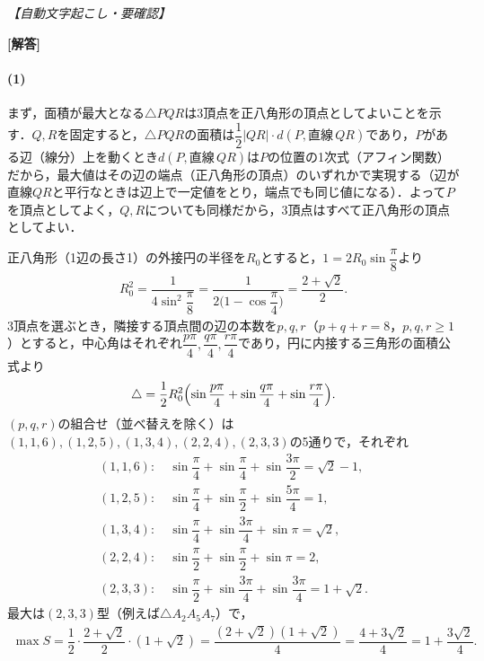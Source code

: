 \documentclass[../../main.tex]{subfiles}
\begin{document}
\begin{oframed}
  
\end{oframed}

\begin{flushright}
  \footnotesize\textit{【自動文字起こし・要確認】}
\end{flushright}

{\bf [解答]}
\paragraph{(1)}

まず，面積が最大となる$\triangle PQR$は3頂点を正八角形の頂点としてよいことを示す．$Q,R$を固定すると，$\triangle PQR$の面積は$\dfrac{1}{2}|QR|\cdot d(P,\text{直線}\,QR)$であり，$P$がある辺（線分）上を動くとき$d(P,\text{直線}\,QR)$は$P$の位置の1次式（アフィン関数）だから，最大値はその辺の端点（正八角形の頂点）のいずれかで実現する（辺が直線$QR$と平行なときは辺上で一定値をとり，端点でも同じ値になる）．よって$P$を頂点としてよく，$Q,R$についても同様だから，3頂点はすべて正八角形の頂点としてよい．

正八角形（1辺の長さ1）の外接円の半径を$R_0$とすると，$1=2R_0\sin\dfrac{\pi}{8}$より
\begin{align}
  R_0^2=\dfrac{1}{4\sin^2\dfrac{\pi}{8}}=\dfrac{1}{2\bigl(1-\cos\dfrac{\pi}{4}\bigr)}=\dfrac{2+\sqrt{2}}{2}.
\end{align}
3頂点を選ぶとき，隣接する頂点間の辺の本数を$p,q,r$（$p+q+r=8$，$p,q,r\ge1$）とすると，中心角はそれぞれ$\dfrac{p\pi}{4},\dfrac{q\pi}{4},\dfrac{r\pi}{4}$であり，円に内接する三角形の面積公式より
\begin{align}
  \triangle=\dfrac{1}{2}R_0^2\Bigl(\sin\dfrac{p\pi}{4}+\sin\dfrac{q\pi}{4}+\sin\dfrac{r\pi}{4}\Bigr).
\end{align}
$(p,q,r)$の組合せ（並べ替えを除く）は$(1,1,6),(1,2,5),(1,3,4),(2,2,4),(2,3,3)$の5通りで，それぞれ
\begin{align}
  (1,1,6):&\ \sin\dfrac{\pi}{4}+\sin\dfrac{\pi}{4}+\sin\dfrac{3\pi}{2}=\sqrt{2}-1,\\
  (1,2,5):&\ \sin\dfrac{\pi}{4}+\sin\dfrac{\pi}{2}+\sin\dfrac{5\pi}{4}=1,\\
  (1,3,4):&\ \sin\dfrac{\pi}{4}+\sin\dfrac{3\pi}{4}+\sin\pi=\sqrt{2},\\
  (2,2,4):&\ \sin\dfrac{\pi}{2}+\sin\dfrac{\pi}{2}+\sin\pi=2,\\
  (2,3,3):&\ \sin\dfrac{\pi}{2}+\sin\dfrac{3\pi}{4}+\sin\dfrac{3\pi}{4}=1+\sqrt{2}.
\end{align}
最大は$(2,3,3)$型（例えば$\triangle A_2A_5A_7$）で，
\begin{align}
  \max S=\dfrac{1}{2}\cdot\dfrac{2+\sqrt{2}}{2}\cdot(1+\sqrt{2})=\dfrac{(2+\sqrt{2})(1+\sqrt{2})}{4}=\dfrac{4+3\sqrt{2}}{4}=1+\dfrac{3\sqrt{2}}{4}.
\end{align}
\end{document}
